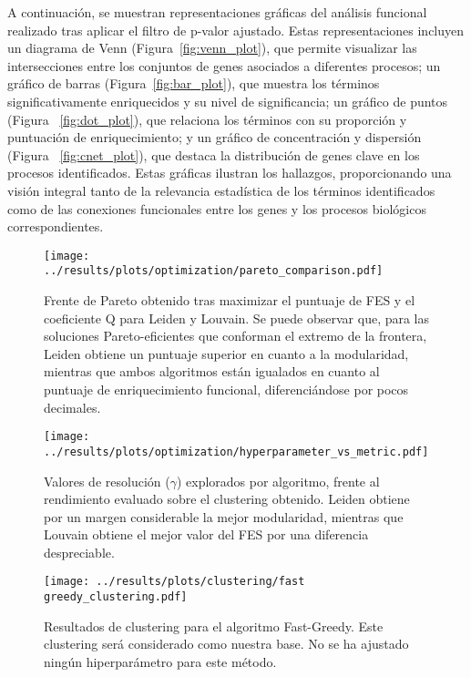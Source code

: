 A continuación, se muestran representaciones gráficas del análisis funcional realizado tras aplicar el filtro de p-valor ajustado. Estas representaciones incluyen un diagrama de Venn (Figura~\ref{fig:venn_plot}), que permite visualizar las intersecciones entre los conjuntos de genes asociados a diferentes procesos; un gráfico de barras (Figura~\ref{fig:bar_plot}), que muestra los términos significativamente enriquecidos y su nivel de significancia; un gráfico de puntos (Figura ~\ref{fig:dot_plot}), que relaciona los términos con su proporción y puntuación de enriquecimiento; y un gráfico de concentración y dispersión (Figura ~\ref{fig:cnet_plot}), que destaca la distribución de genes clave en los procesos identificados. Estas gráficas ilustran los hallazgos, proporcionando una visión integral tanto de la relevancia estadística de los términos identificados como de las conexiones funcionales entre los genes y los procesos biológicos correspondientes.

\newpage

\begin{figure}[htbp!]
	\centering
	\texttt{[image: ../results/plots/optimization/pareto\_comparison.pdf]}
	\caption{Frente de Pareto obtenido tras maximizar el puntuaje de FES y el coeficiente Q para Leiden y Louvain. Se puede observar que, para las soluciones Pareto-eficientes que conforman el extremo de la frontera, Leiden obtiene un puntuaje superior en cuanto a la modularidad, mientras que ambos algoritmos están igualados en cuanto al puntuaje de enriquecimiento funcional, diferenciándose por pocos decimales.}
	\label{fig:pareto}
\end{figure}

\begin{figure}[htbp!]
	\centering
	\texttt{[image: ../results/plots/optimization/hyperparameter\_vs\_metric.pdf]}
	\caption{Valores de resolución (\(\gamma\)) explorados por algoritmo, frente al rendimiento evaluado sobre el clustering obtenido. Leiden obtiene por un margen considerable la mejor modularidad, mientras que Louvain obtiene el mejor valor del FES por una diferencia despreciable.}
	\label{fig:slice_plot}
\end{figure}

\begin{figure}[htbp!]
	\centering
	\texttt{[image: ../results/plots/clustering/fast greedy\_clustering.pdf]}
	\caption{Resultados de clustering para el algoritmo Fast-Greedy. Este clustering será considerado como nuestra base. No se ha ajustado ningún hiperparámetro para este método.}
	\label{fig:fastgreedy_clustering}
\end{figure}

